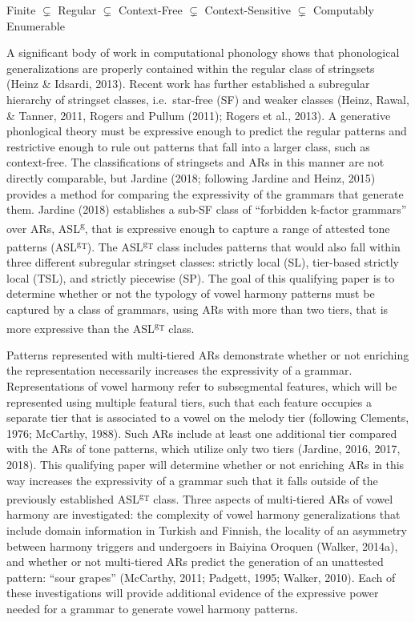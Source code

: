 \documentclass[floatsintext,man]{apa6}
\theoremstyle{definition}
\theoremstyle{definition}
\theoremstyle{definition}
\theoremstyle{remark}
\begin{document}
\begin{exe}
\label{chomsky.hierarchy} 
Finite $\subsetneq$ Regular $\subsetneq$ Context-Free $\subsetneq$ Context-Sensitive $\subsetneq$ Computably Enumerable
\end{exe}

A significant body of work in computational phonology shows that
phonological generalizations are properly contained within the regular
class of stringsets (Heinz \& Idsardi, 2013). Recent work has further
established a subregular hierarchy of stringset classes, i.e.~star-free
(SF) and weaker classes (Heinz, Rawal, \& Tanner, 2011, Rogers and
Pullum (2011); Rogers et al., 2013). A generative phonlogical theory
must be expressive enough to predict the regular patterns and
restrictive enough to rule out patterns that fall into a larger class,
such as context-free. The classifications of stringsets and ARs in this
manner are not directly comparable, but Jardine (2018; following Jardine
and Heinz, 2015) provides a method for comparing the expressivity of the
grammars that generate them. Jardine (2018) establishes a sub-SF class
of \enquote{forbidden k-factor grammars} over ARs,
ASL\textsuperscript{g}, that is expressive enough to capture a range of
attested tone patterns (ASL\textsuperscript{g\textsubscript{T}}). The
ASL\textsuperscript{g\textsubscript{T}} class includes patterns that
would also fall within three different subregular stringset classes:
strictly local (SL), tier-based strictly local (TSL), and strictly
piecewise (SP). The goal of this qualifying paper is to determine
whether or not the typology of vowel harmony patterns must be captured
by a class of grammars, using ARs with more than two tiers, that is more
expressive than the ASL\textsuperscript{g\textsubscript{T}} class.

Patterns represented with multi-tiered ARs demonstrate whether or not
enriching the representation necessarily increases the expressivity of a
grammar. Representations of vowel harmony refer to subsegmental
features, which will be represented using multiple featural tiers, such
that each feature occupies a separate tier that is associated to a vowel
on the melody tier (following Clements, 1976; McCarthy, 1988). Such ARs
include at least one additional tier compared with the ARs of tone
patterns, which utilize only two tiers (Jardine, 2016, 2017, 2018). This
qualifying paper will determine whether or not enriching ARs in this way
increases the expressivity of a grammar such that it falls outside of
the previously established ASL\textsuperscript{g\textsubscript{T}}
class. Three aspects of multi-tiered ARs of vowel harmony are
investigated: the complexity of vowel harmony generalizations that
include domain information in Turkish and Finnish, the locality of an
asymmetry between harmony triggers and undergoers in Baiyina Oroquen
(Walker, 2014a), and whether or not multi-tiered ARs predict the
generation of an unattested pattern: \enquote{sour grapes} (McCarthy,
2011; Padgett, 1995; Walker, 2010). Each of these investigations will
provide additional evidence of the expressive power needed for a grammar
to generate vowel harmony patterns.
\end{document}
